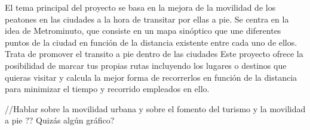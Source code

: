 
El tema principal del proyecto se basa en la mejora de la movilidad de los peatones en las ciudades a la hora de transitar por ellas a pie. Se centra en la idea de Metrominuto, que consiste en un mapa sinóptico que une diferentes puntos de la ciudad en función de la distancia existente entre cada uno de ellos. Trata de promover el transito a pie dentro de las ciudades
Este proyecto ofrece la posibilidad de marcar tus propias rutas incluyendo los lugares o destinos que quieras visitar y calcula la mejor forma de recorrerlos en función de la distancia para minimizar el tiempo y recorrido empleados en ello.

//Hablar sobre la movilidad urbana y sobre el fomento del turismo y la movilidad a pie ?? Quizás algún gráfico?



